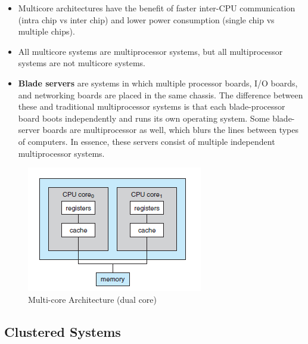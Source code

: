 \documentclass{article}
\theoremstyle{plain}
\theoremstyle{definition}
\begin{document}
\begin{itemize}
    \item Multicore architectures have the benefit of faster inter-CPU communication (intra chip vs inter chip) and lower power consumption (single chip vs multiple chips). 
    
    \item All multicore systems are multiprocessor systems, but all multiprocessor systems are not multicore systems.
    
    \item \textbf{Blade servers} are systems in which multiple
processor boards, I/O boards, and networking boards are placed in the same chassis. The difference between these and traditional multiprocessor systems is that each blade-processor board boots independently and runs its own operating system. Some blade-server boards are multiprocessor as well, which blurs the lines between types of computers. In essence, these servers consist of multiple independent multiprocessor systems.
\end{itemize}

\begin{figure}[h]
    \centering
    \includegraphics{os4}
    \caption{Multi-core Architecture (dual core)}
    \label{fig:my_label_4}
\end{figure}

\subsection{Clustered Systems}
\end{document}
